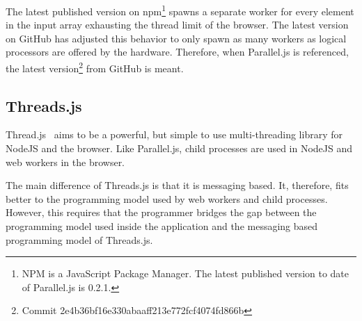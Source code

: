 The latest published version on npm\footnote{NPM is a JavaScript Package Manager. The latest published version to date of Parallel.js is 0.2.1.} spawns a separate worker for every element in the input array exhausting the thread limit of the browser. The latest version on GitHub has adjusted this behavior to only spawn as many workers as logical processors are offered by the hardware. Therefore, when Parallel.js is referenced, the latest version\footnote{Commit 2e4b36bf16e330abaaff213e772fcf4074fd866b} from GitHub is meant.

\subsection{Threads.js}
Thread.js~\cite{Wermke2016} aims to be a powerful, but simple to use multi-threading library for NodeJS and the browser. Like Parallel.js, child processes are used in NodeJS and web workers in the browser.

The main difference of Threads.js is that it is messaging based. It, therefore, fits better to the programming model used by web workers and child processes. However, this requires that the programmer bridges the gap between the programming model used inside the application and the messaging based programming model of Threads.js.